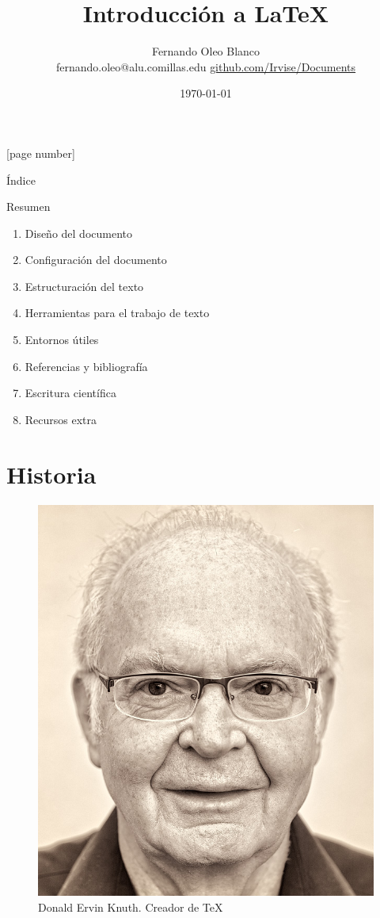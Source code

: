 \documentclass[12pt]{beamer}
\begin{document}
	\author{Fernando Oleo Blanco \\ fernando.oleo@alu.comillas.edu \hfill 	\href{https://github.com/Irvise/Documents}{github.com/Irvise/Documents}}
	\title{Introducción a \textrm{\LaTeX}}
	\date{\today}
	[page number]
\begin{frame}[plain]
	\maketitle
\end{frame}

\begin{frame}{Índice}
\tableofcontents
\end{frame}

\begin{frame}{Resumen}
\begin{enumerate}
	\item Diseño del documento
	\item Configuración del documento
	\item Estructuración del texto
	\item Herramientas para el trabajo de texto
	\item Entornos útiles
	\item Referencias y bibliografía
	\item Escritura científica
	\item Recursos extra
\end{enumerate}
\end{frame}

\section{Historia}

\begin{frame}[plain]
	\begin{figure}
		\centering
		\includegraphics[height=0.75\linewidth]{Donald-Knuth-Stanford-Computer-Science}
		\caption{Donald Ervin Knuth. Creador de \TeX}
		\label{fig:donald}
	\end{figure}
\end{frame}
\end{document}
